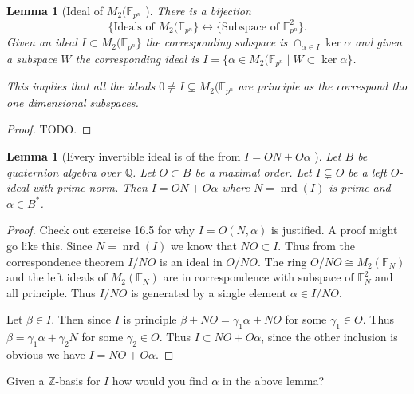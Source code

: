 \documentclass[10pt]{article}
\theoremstyle{plain}
\newtheorem{lemma}[theorem]{Lemma}
\theoremstyle{definition}
\newcommand{\iso}{\cong}
\newcommand{\op}{\operatorname}
\newcommand{\Z}{\mathbb{Z}}
\newcommand{\Q}{\mathbb{Q}}
\newcommand{\F}{\mathbb{F}}
\newcommand{\nrd}{\op{nrd}}
\begin{document}
\begin{lemma}[Ideal of \( M_2(\F_{p^n} \) ]
    There is a bijection
    \[
        \{\text{Ideals of } M_2(\F_{p^n}\} \leftrightarrow \{ \text{Subspace of } \F_{p^n}^2 \}.
    \]
    Given an ideal \( I \subset  M_2(\F_{p^n}\} \) the corresponding subspace is \( \cap_{\alpha \in I} \ker \alpha \) and given a subspace \( W \) the corresponding ideal is \( I = \{\alpha \in M_2(\F_{p^n} \mid W \subset \ker \alpha\} \).

    This implies that all the ideals \( 0 \neq I \subsetneq M_2(\F_{p^n} \) are principle as the correspond tho one dimensional subspaces.
\end{lemma}
\begin{proof}
    TODO.
\end{proof}

\begin{lemma}[Every invertible ideal is of the from \( I = ON + O\alpha \) ]
    Let \( B \) be quaternion algebra over \( \Q \).
    Let \( O \subset B \) be a maximal order.
    Let \( I \subsetneq O \) be a left \( O \)-ideal with prime norm.
    Then \( I = ON + O \alpha \) where \( N = \nrd(I) \) is prime and \( \alpha \in B^* \).
\end{lemma}
\begin{proof}
    {\color{red} Check out exercise 16.5 for why \( I = O(N, \alpha) \) is justified.}
    A proof might go like this.
    Since \( N = \nrd(I) \) we know that \( NO \subset I \).
    Thus from the correspondence theorem \( I / NO \) is an ideal in \( O / NO \).
    The ring \( O / NO \iso M_2(\F_N) \) and the left ideals of \( M_2(\F_N) \) are in correspondence with subspace of \( \F_N^2 \) and all principle.
    Thus \( I / NO \) is generated by a single element \( \alpha \in I / NO \).

    Let \( \beta \in I \).
    Then since \( I \) is principle \( \beta + NO = \gamma_1 \alpha + NO \) for some \( \gamma_1 \in O \).
    Thus \( \beta = \gamma_1\alpha + \gamma_2N \) for some \( \gamma_2 \in O \).
    Thus \( I \subset NO + O\alpha \), since the other inclusion is obvious we have \( I =  NO + O\alpha \).
\end{proof}

{\color{red} Given a \( \Z \)-basis for \( I \) how would you find \( \alpha \) in the above lemma?}
\end{document}
